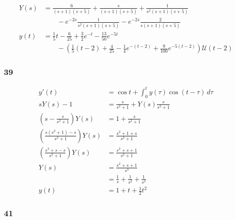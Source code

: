 \documentclass{article}
\begin{document}
\begin{align*}
  Y(s) & = \frac{6}{(s + 1) (s + 5)} + \frac{s}{(s + 1) (s + 5)} + \frac{1}{s^2 (s + 1) (s + 5)}                                                 \\
       & \qquad - e^{-2 s} \frac{1}{s^2 (s + 1) (s + 5)} - e^{-2 s} \frac{2}{s (s + 1) (s + 5)}                                                  \\
  y(t) & = \frac{1}{5} t - \frac{6}{25} + \frac{3}{2} e^{-t} - \frac{13}{50} e^{-5 t}                                                            \\
       & \qquad - \left( \frac{1}{5} (t - 2) + \frac{4}{25} - \frac{1}{4} e^{-(t - 2)} + \frac{9}{100} e^{-5 (t - 2)} \right) \mathcal{U}(t - 2)
\end{align*}

\subsubsection{39}

\begin{align*}
  y'(t)                                               & = \cos t + \int_0^t y(\tau) \cos (t - \tau) \,d\tau \\
  s Y(s) - 1                                          & = \frac{s}{s^2 + 1} + Y(s) \frac{s}{s^2 + 1}        \\
  \left( s - \frac{s}{s^2 + 1} \right) Y(s)           & = 1 + \frac{s}{s^2 + 1}                             \\
  \left( \frac{s (s^2 + 1) - s}{s^2 + 1} \right) Y(s) & = \frac{s^2 + 1 + s}{s^2 + 1}                       \\
  \left( \frac{s^3 + s - s}{s^2 + 1} \right) Y(s)     & = \frac{s^2 + s + 1}{s^2 + 1}                       \\
  Y(s)                                                & = \frac{s^2 + s + 1}{s^3}                           \\
                                                      & = \frac{1}{s} + \frac{1}{s^2} + \frac{1}{s^3}       \\
  y(t)                                                & = 1 + t + \frac{1}{2} t^2
\end{align*}

\subsubsection{41}
\end{document}
